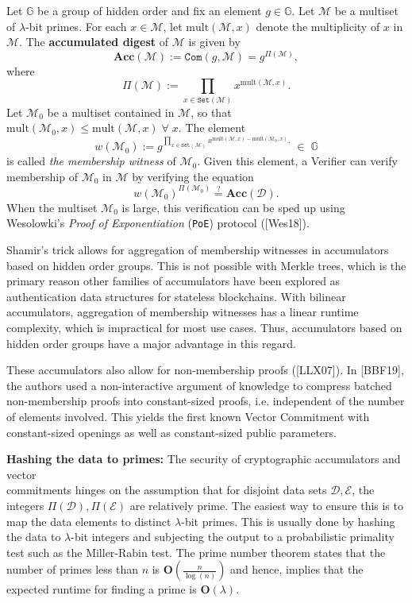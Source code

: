 \documentclass[11pt, lettersize, notitlepage, leqno, footskip=0.6cm]{article}
\newcommand{\pl}{\prod\limits}
\newcommand{\ttt}{\texttt}
\newcommand{\Acc}{\mbf{Acc}}
\newcommand{\sett}{\ttt{Set}}
\newcommand{\mult}{\mr{mult}}
\newcommand{\mc}{\mathcal}
\newcommand{\mb}{\mathbb}
\newcommand{\mbf}{\mathbf}
\newcommand{\mr}{\mathrm}
\newcommand{\lam}{\lambda}
\newcommand{\mcM}{\mc{M}}
\newcommand{\vs}{\vspace{-0.15cm}}
\newcommand{\noin}{\noindent}
\newcommand{\sta}{\stackrel{?}{=}}
\numberwithin{equation}{section}
\begin{document}
Let $\mb{G}$ be a group of hidden order and fix an element $g \in\mb{G}$. Let $\mc{M}$ be a multiset of $\lam$-bit primes. For each $x\in \mc{M}$, let $\mult(\mc{M},x)$ denote the multiplicity of $x$ in $\mcM$. The \textbf{accumulated digest} of $\mc{M}$ is given by \vs $$\Acc(\mc{M}):= \ttt{Com}(g,\mcM) =   g^{\Pi(\mc{M})} ,$$ where $$\Pi(\mc{M}) := \pl_{x\in \sett(\mc{M})} x^{\mult(\mc{M},x)} .$$ Let $\mc{M}_0$ be a multiset contained in $\mc{M}$, so that  $\mult(\mc{M}_0,x)\leq \mult(\mc{M},x)\;\forall\;x$. The element \vs $$w(\mc{M}_0):= g^{\pl_{x\in \sett(\mc{M})} x^{\mult(\mc{M},x)-\mult(\mc{M}_0,x)} .}\;\in\;\mb{G} $$ is called \textit{the membership witness} of $\mc{M}_0$. Given this element, a Verifier can verify membership of $\mc{M}_0$ in $\mc{M}$ by verifying the equation \vs $$w(\mc{M}_0)^{\Pi(\mc{M}_0)} \sta \Acc(\mc{D}).$$ When the multiset $\mc{M}_0$ is large, this verification can be sped up using Wesolowki's \textit{Proof of Exponentiation} (\verb|PoE|) protocol ([Wes18]).

Shamir's trick allows for aggregation of membership witnesses in accumulators based on hidden order groups. This is not possible with Merkle trees, which is the primary reason other families of accumulators have been explored as authentication data structures for stateless blockchains. With bilinear accumulators, aggregation of membership witnesses has a linear runtime complexity, which is impractical for most use cases. Thus, accumulators based on hidden order groups have a major advantage in this regard.

These accumulators also allow for non-membership proofs ([LLX07]). In [BBF19], the authors used a non-interactive argument of knowledge to compress batched non-membership proofs into constant-sized proofs, i.e. independent of the number of elements involved. This yields the first known Vector Commitment with constant-sized openings as well as  constant-sized public parameters.\vspace{0.15cm}

\noin \textbf{Hashing the data to primes:} The security of cryptographic accumulators and vector\\ commitments hinges on the assumption that for disjoint data sets $\mc{D},\mc{E}$, the integers $\Pi(\mc{D}), \Pi(\mc{E})$ are relatively prime. The easiest way to ensure this is to map the data elements to distinct $\lam$-bit primes. This is usually done by hashing the data to $\lam$-bit integers and subjecting the output to a probabilistic primality test such as the Miller-Rabin test. The prime number theorem states that the number of primes less than $n$ is $\mbf{O}(\frac{n}{\log(n)})$ and hence, implies that the expected runtime for finding a prime is $\mbf{O}(\lam)$.
\end{document}
